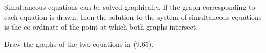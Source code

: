         
        \label{m39257*id159067}Simultaneous equations can be solved graphically. If the graph corresponding to each equation is drawn, then the solution to the system of simultaneous equations is the co-ordinate of the point at which both graphs intersect.\par 
        \label{m39257*uid95}\nopagebreak\noindent{}
    
        
        \label{m39257*id159120}Draw the graphs of the two equations in (9.65).\par 
        
    \setcounter{subfigure}{0}



